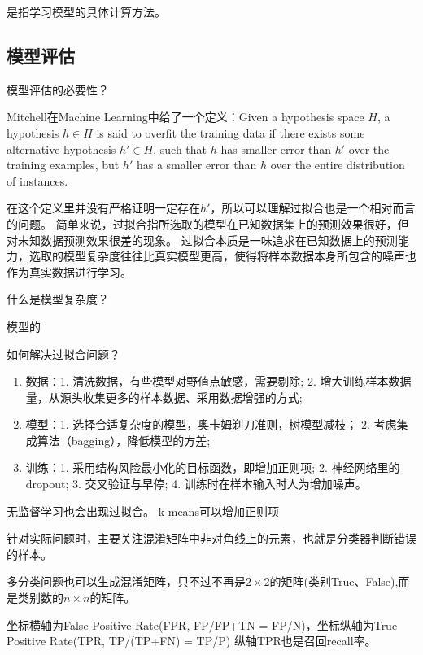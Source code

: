 {}是指学习模型的具体计算方法。


\subsection{模型评估}
模型评估的必要性？

{}

Mitchell在Machine Learning中给了一个定义：Given a hypothesis space $H$, a hypothesis $h \in H$ 
is said to overfit the training data if there exists some alternative hypothesis $h' \in H$,
such that $h$ has smaller error than $h'$ over the training examples, but $h'$ has a smaller
error than $h$ over the entire distribution of instances.

在这个定义里并没有严格证明一定存在$h'$，所以可以理解过拟合也是一个相对而言的问题。
简单来说，过拟合指所选取的模型在已知数据集上的预测效果很好，但对未知数据预测效果很差的现象。
过拟合本质是一味追求在已知数据上的预测能力，选取的模型复杂度往往比真实模型更高，使得将样本数据本身所包含的噪声也作为真实数据进行学习。

什么是模型复杂度？

模型的

如何解决过拟合问题？
\begin{enumerate}
\item 数据：1. 清洗数据，有些模型对野值点敏感，需要剔除; 2. 增大训练样本数据量，从源头收集更多的样本数据、采用数据增强的方式; 
\item 模型：1. 选择合适复杂度的模型，奥卡姆剃刀准则，树模型减枝； 2. 考虑集成算法（bagging），降低模型的方差;
\item 训练：1. 采用结构风险最小化的目标函数，即增加正则项; 2. 神经网络里的dropout; 3. 交叉验证与早停; 4. 训练时在样本输入时人为增加噪声。
\end{enumerate}

\href{http://sofasofa.io/forum_main_post.php?postid=1000490}{无监督学习也会出现过拟合}。
\href{http://sofasofa.io/forum_main_post.php?postid=1001398}{k-means可以增加正则项}

{}

针对实际问题时，主要关注混淆矩阵中非对角线上的元素，也就是分类器判断错误的样本。

多分类问题也可以生成混淆矩阵，只不过不再是$2 \times 2$的矩阵(类别True、False),而是类别数的$n \times n$的矩阵。

{}

坐标横轴为False Positive Rate(FPR, FP/FP+TN = FP/{\color{red}N})，坐标纵轴为True Positive Rate(TPR, TP/(TP+FN) = TP/P)
纵轴TPR也是召回recall率。

